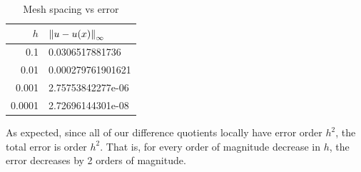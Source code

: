 \documentclass[10pt]{article}
\begin{document}
\begin{solution}
\begin{enumerate}
        \begin{table}[H]\centering\tt
            \begin{tabular}{|r|l|} \hline 
                \( h \) & \( \left\lVert u-u(x)\right\rVert_\infty \) \\ \hline
                0.1 & 0.0306517881736 \\
                0.01 & 0.000279761901621 \\
                0.001 & 2.75753842277e-06 \\
                0.0001 & 2.72696144301e-08 \\ \hline
            \end{tabular}
            \caption{Mesh spacing vs error}
            \label{fdqerror}
        \end{table}

        As expected, since all of our difference quotients locally have error order \( h^2 \), the total error is order \( h^2 \). That is, for every order of magnitude decrease in \( h \), the error decreases by 2 orders of magnitude.

\end{enumerate}
\end{solution}
\end{document}
